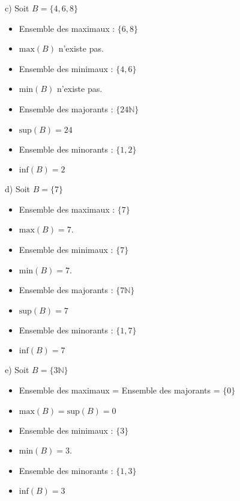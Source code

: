 \documentclass[a4paper,12pt]{article}
\begin{document}
\begin{minipage}{0.5\textwidth}
	c) Soit $B = \{4, 6, 8\}$

	\begin{itemize}
		\item Ensemble des maximaux : $\{6, 8\}$
		\item $\text{max}(B)$ n'existe pas.
		\item Ensemble des minimaux : $\{4, 6\}$
		\item $\text{min}(B)$ n'existe pas.
		\item Ensemble des majorants : $\{24\mathbb{N}\}$
		\item $\text{sup}(B) = 24$
		\item Ensemble des minorants : $\{1, 2\}$
		\item $\text{inf}(B) = 2$
	\end{itemize}
\end{minipage}
\begin{minipage}{0.5\textwidth}
	d) Soit $B = \{7\}$

	\begin{itemize}
		\item Ensemble des maximaux : $\{7\}$
		\item $\text{max}(B) = 7$.
		\item Ensemble des minimaux : $\{7\}$
		\item $\text{min}(B) = 7$.
		\item Ensemble des majorants : $\{7\mathbb{N}\}$
		\item $\text{sup}(B) = 7$
		\item Ensemble des minorants : $\{1, 7\}$
		\item $\text{inf}(B) = 7$
	\end{itemize}
\end{minipage}

e) Soit $B = \{3\mathbb{N}\}$

\begin{itemize}
	\item Ensemble des maximaux = Ensemble des majorants = $\{0\}$
	\item $\text{max}(B) = \text{sup}(B) = 0$
	\item Ensemble des minimaux : $\{3\}$
	\item $\text{min}(B) = 3$.
	\item Ensemble des minorants : $\{1, 3\}$
	\item $\text{inf}(B) = 3$
\end{itemize}

\newpage
\end{document}
